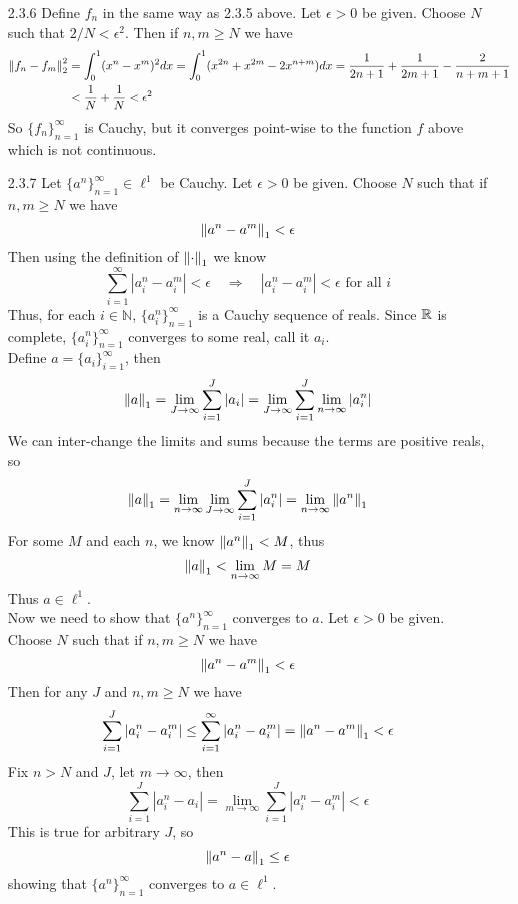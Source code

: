 \documentclass[../../Solutions.tex]{subfiles}
\begin{document}
\begin{itemize}
	\item [2.3.6] Define $f_n$ in the same way as 2.3.5 above.
		Let $\epsilon > 0$ be given.
		Choose $N$ such that $2/N < \epsilon^2$.
		Then if $n,m \geq N$ we have
		\begin{equation*} \begin{split}
			\left\lVert f_n-f_m\right\rVert_2^2 & = \int_0^1(x^n-x^m)^2dx = \int_0^1(x^{2n}+x^{2m}-2x^{n+m})dx = \frac{1}{2n+1}+\frac{1}{2m+1}-\frac{2}{n+m+1} \\
				& < \frac{1}{N} + \frac{1}{N} < \epsilon^2
		\end{split} \end{equation*}
		So $\{f_n\}_{n=1}^\infty$ is Cauchy, but it converges point-wise to the function $f$ above which is not continuous.
	
	\item [2.3.7] Let $\{a^n\}_{n=1}^\infty \in \ell^1$ be Cauchy.
		Let $\epsilon > 0$ be given.
		Choose $N$ such that if $n,m \geq N$ we have
		$$ \left\lVert a^n-a^m\right\rVert_1 < \epsilon $$
		Then using the definition of $\left\lVert\cdot\right\rVert_1$ we know
		$$ \sum_{i=1}^\infty |a^n_i-a^m_i| < \epsilon \quad\Longrightarrow\quad |a^n_i-a^m_i| < \epsilon \text{ for all } i $$
		Thus, for each $i \in \mathbb{N}$, $\{a^n_i\}_{n=1}^\infty$ is a Cauchy sequence of reals.
		Since $\mathbb{R}$ is complete, $\{a^n_i\}_{n=1}^\infty$ converges to some real, call it $a_i$. \\
		Define $a = \{a_i\}_{i=1}^\infty$, then
		$$ \left\lVert a\right\rVert_1 = \lim_{J\to\infty} \sum_{i=1}^J |a_i| = \lim_{J\to\infty}\sum_{i=1}^J\lim_{n\to\infty} |a^n_i| $$
		We can inter-change the limits and sums because the terms are positive reals, so
		$$ \left\lVert a\right\rVert_1 = \lim_{n\to\infty}\lim_{J\to\infty}\sum_{i=1}^J |a^n_i| = \lim_{n\to\infty}\left\lVert a^n\right\rVert_1 $$
		For some $M$ and each $n$, we know $\left\lVert a^n\right\rVert_1 < M$, thus
		$$ \left\lVert a\right\rVert_1 < \lim_{n\to\infty} M = M $$
		Thus $a \in \ell^1$. \\
		Now we need to show that $\{a^n\}_{n=1}^\infty$ converges to $a$.
		Let $\epsilon > 0$ be given.
		Choose $N$ such that if $n,m \geq N$ we have
		$$ \left\lVert a^n-a^m\right\rVert_1 < \epsilon $$
		Then for any $J$ and $n,m \geq N$ we have
		$$ \sum_{i=1}^J |a^n_i-a^m_i| \leq \sum_{i=1}^\infty |a^n_i-a^m_i| = \left\lVert a^n-a^m\right\rVert_1 < \epsilon $$
		Fix $n > N$ and $J$, let $m \to \infty$, then
		$$ \sum_{i=1}^J |a^n_i-a_i| = \lim_{m \to \infty} \sum_{i=1}^J |a^n_i-a^m_i| < \epsilon $$
		This is true for arbitrary $J$, so
		$$ \left\lVert a^n - a\right\rVert_1 \leq \epsilon $$
		showing that $\{a^n\}_{n=1}^\infty$ converges to $a \in \ell^1$.
		

\end{itemize}
\end{document}
